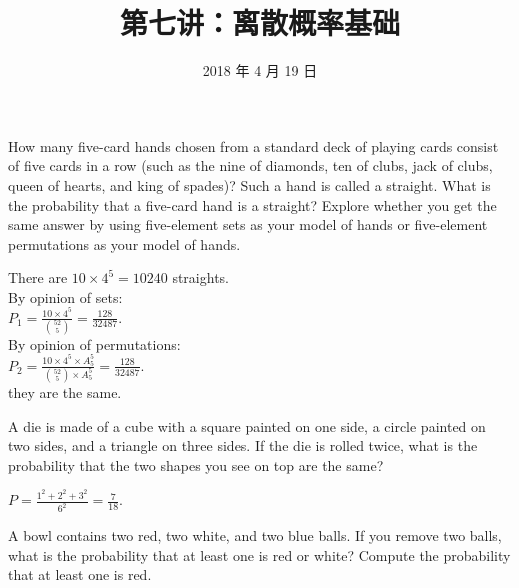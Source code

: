\documentclass[12pt, a4paper, UTF8]{ctexart}
\title{第七讲：离散概率基础}
\date{2018 年 4 月 19 日}     %
\begin{document}
\maketitle
\noplagiarism	%
\beginrequired	%

\begin{problem}[CS: 5.1.10]	%
  How many five-card hands chosen from a standard deck of playing cards consist 
  of five cards in a row (such as the nine of diamonds, ten of clubs, jack of 
  clubs, queen of hearts, and king of spades)? Such a hand is called a straight. 
  What is the probability that a five-card hand is a straight? Explore whether 
  you get the same answer by using five-element sets as your model of hands or 
  five-element permutations as your model of hands.
\end{problem}



\begin{solution}
  There are $10 \times 4^{5} = 10240$ straights.\\
  By opinion of sets:\\
  $P_{1} = \frac{10 \times 4^{5}}{\binom{52}{5}} = \frac{128}{32487}.$\\
  By opinion of permutations:\\
  $P_{2} = \frac{10 \times 4^{5} \times A_{5}^{5}}{\binom{52}{5} \times A_{5}^{5}} 
  = \frac{128}{32487}.$\\
  they are the same.
\end{solution}

\begin{problem}[CS: 5.1.12]
  A die is made of a cube with a square painted on one side, a circle painted 
  on two sides, and a triangle on three sides. If the die is rolled twice, what 
  is the probability that the two shapes you see on top are the same?
\end{problem}

\begin{solution}
  $P = \frac{1^{2} + 2^{2} + 3^{2}}{6^{2}} = \frac{7}{18}.$
\end{solution}
\begin{problem}[CS: 5.2.4]
  A bowl contains two red, two white, and two blue balls. If you remove two 
  balls, what is the probability that at least one is red or white? Compute 
  the probability that at least one is red.
\end{problem}
\end{document}
